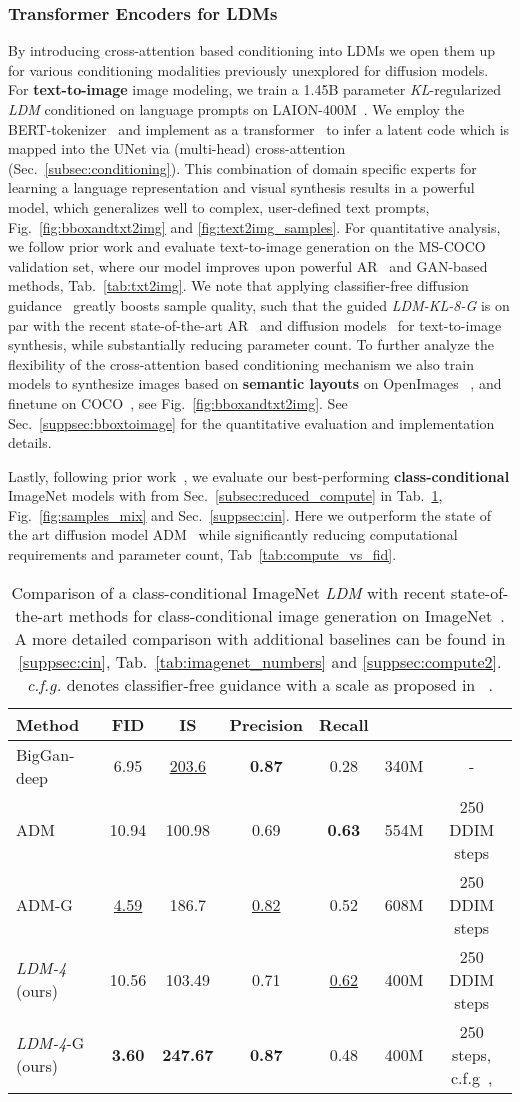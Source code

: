 \documentclass[10pt,twocolumn,letterpaper]{article}
\newcommand{\cinmainmetrics}{
\begin{table}[htbp]
\centering
\begin{footnotesize}
\begin{adjustbox}{max width=\linewidth}
\footnotesize
\begin{tabular}{lcccccc}
\toprule
\textbf{Method} & FID & IS & Precision & Recall &  & \\
\midrule
BigGan-deep~\cite{bigganbrock}& 6.95 & \underline{203.6\tiny} & \textbf{0.87} & 0.28  & 340M & - \\
ADM~\cite{DBLP:journals/corr/abs-2105-05233} & 10.94 & 100.98& 0.69 & \textbf{0.63}  & 554M & 250 DDIM steps\\
ADM-G~\cite{DBLP:journals/corr/abs-2105-05233} & \underline{4.59}  & 186.7& \underline{0.82} & 0.52 & 608M & 250 DDIM steps \\
\midrule
\emph{LDM-4} (ours) & 10.56 & 103.49\tiny  & 0.71  & \underline{0.62} & 400M & 250 DDIM steps\\
\emph{LDM-4}-G (ours) & \textbf{3.60} & \textbf{247.67\tiny}  & \textbf{0.87}  & 0.48 & 400M & 250 steps, c.f.g~\cite{ho2021classifier}, \\
\bottomrule
\end{tabular}
\end{adjustbox}
\end{footnotesize}
\caption{\label{tab:imagenet_main_numbers} Comparison of a class-conditional ImageNet \emph{LDM} with recent state-of-the-art methods for class-conditional image generation on ImageNet~\cite{DBLP:conf/cvpr/DengDSLL009}. A more detailed comparison with additional baselines can be found in \ref{suppsec:cin}, Tab.~\ref{tab:imagenet_numbers} and \ref{suppsec:compute2}. \emph{c.f.g.} denotes classifier-free guidance with a scale  as proposed in ~\cite{ho2021classifier}.}
\end{table}
}
\begin{document}
\subsubsection{Transformer Encoders for LDMs}
\label{subsubsec:crossattn2img}
\vspace{-0.5em}
By introducing cross-attention based conditioning into LDMs
we open them up for various
conditioning modalities previously unexplored for diffusion models. 
For \textbf{text-to-image} image modeling, we train a 1.45B parameter \emph{KL}-regularized \emph{LDM} conditioned on language prompts on LAION-400M~\cite{schuhmann2021laion400m}. 
We employ the BERT-tokenizer~\cite{DBLP:journals/corr/abs-1810-04805} and implement  as a transformer~\cite{DBLP:conf/nips/VaswaniSPUJGKP17} to infer a latent code which 
is mapped into the UNet via (multi-head) cross-attention (Sec.~\ref{subsec:conditioning}).
This combination of domain specific experts for learning a language representation and visual synthesis results in a powerful model, which generalizes well to complex, user-defined text prompts, \cf Fig.~\ref{fig:bboxandtxt2img} and \ref{fig:text2img_samples}. For quantitative analysis, we follow prior work and evaluate text-to-image generation on the MS-COCO~\cite{DBLP:journals/corr/LinMBHPRDZ14} validation set, where our model improves upon powerful AR~\cite{DBLP:journals/corr/abs-2102-12092,DBLP:journals/corr/abs-2105-13290} and GAN-based~\cite{DBLP:journals/corr/abs-2111-13792} methods, \cf Tab.~\ref{tab:txt2img}. We note that applying classifier-free diffusion guidance~\cite{ho2021classifier} greatly boosts sample quality, such that the guided \emph{LDM-KL-8-G} is on par with the recent state-of-the-art AR~\cite{DBLP:journals/corr/abs-2203-13131} and diffusion models~\cite{DBLP:journals/corr/abs-2112-10741} for text-to-image synthesis, while substantially reducing parameter count.
To further analyze the flexibility of the cross-attention based conditioning mechanism we also train models to synthesize images based on \textbf{semantic layouts} on OpenImages ~\cite{DBLP:journals/corr/abs-1811-00982},
and finetune on COCO~\cite{DBLP:conf/cvpr/CaesarUF18}, see Fig.~\ref{fig:bboxandtxt2img}.
See Sec.~\ref{suppsec:bboxtoimage} for the quantitative evaluation and implementation details.

Lastly, following prior work~\cite{DBLP:journals/corr/abs-2105-05233,bigganbrock,DBLP:journals/corr/abs-2012-09841,DBLP:journals/corr/abs-2108-08827}, we evaluate our best-performing \textbf{class-conditional} ImageNet models with  from Sec.~\ref{subsec:reduced_compute} in Tab.~\ref{tab:imagenet_main_numbers}, Fig.~\ref{fig:samples_mix} and 
Sec.~\ref{suppsec:cin}. Here we outperform the state of the art diffusion model ADM~\cite{DBLP:journals/corr/abs-2105-05233} while significantly reducing computational requirements and parameter count, \cf Tab~\ref{tab:compute_vs_fid}.
\cinmainmetrics
\end{document}
